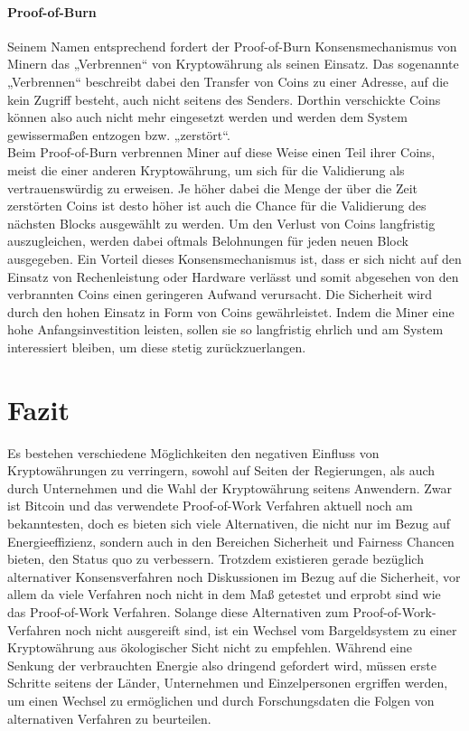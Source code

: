 \documentclass[12pt]{article}
\begin{document}
\subsection{Proof-of-Burn}
Seinem Namen entsprechend fordert der Proof-of-Burn Konsensmechanismus von Minern das „Verbrennen“ von Kryptowährung als seinen Einsatz. Das sogenannte „Verbrennen“ beschreibt dabei den Transfer von Coins zu einer Adresse, auf die kein Zugriff besteht, auch nicht seitens des Senders. Dorthin verschickte Coins können also auch nicht mehr eingesetzt werden und werden dem System gewissermaßen entzogen bzw. „zerstört“.\\
Beim Proof-of-Burn verbrennen Miner auf diese Weise einen Teil ihrer Coins, meist die einer anderen Kryptowährung, um sich für die Validierung als vertrauenswürdig zu erweisen. Je höher dabei die Menge der über die Zeit zerstörten Coins ist desto höher ist auch die Chance für die Validierung des nächsten Blocks ausgewählt zu werden. Um den Verlust von Coins langfristig auszugleichen, werden dabei oftmals Belohnungen für jeden neuen Block ausgegeben.
Ein Vorteil dieses Konsensmechanismus ist, dass er sich nicht auf den Einsatz von Rechenleistung oder Hardware verlässt und somit abgesehen von den verbrannten Coins einen geringeren Aufwand verursacht. Die Sicherheit wird durch den hohen Einsatz in Form von Coins gewährleistet. Indem die Miner eine hohe Anfangsinvestition leisten, sollen sie so langfristig ehrlich und am System interessiert bleiben, um diese stetig zurückzuerlangen.

\part{Fazit}
Es bestehen verschiedene Möglichkeiten den negativen Einfluss von Kryptowährungen zu verringern, sowohl auf Seiten der Regierungen, als auch durch Unternehmen und die Wahl der Kryptowährung seitens Anwendern. Zwar ist Bitcoin und das verwendete Proof-of-Work Verfahren aktuell noch am bekanntesten, doch es bieten sich viele Alternativen, die nicht nur im Bezug auf Energieeffizienz, sondern auch in den Bereichen Sicherheit und Fairness Chancen bieten, den Status quo zu verbessern. Trotzdem existieren gerade bezüglich alternativer Konsensverfahren noch Diskussionen im Bezug auf die Sicherheit, vor allem da viele Verfahren noch nicht in dem Maß getestet und erprobt sind wie das Proof-of-Work Verfahren. Solange diese Alternativen zum Proof-of-Work-Verfahren noch nicht ausgereift sind, ist ein Wechsel vom Bargeldsystem zu einer Kryptowährung aus ökologischer Sicht nicht zu empfehlen. Während eine Senkung der verbrauchten Energie also dringend gefordert wird, müssen erste Schritte seitens der Länder, Unternehmen und Einzelpersonen ergriffen werden, um einen Wechsel zu ermöglichen und durch Forschungsdaten die Folgen von alternativen Verfahren zu beurteilen.
\end{document}
